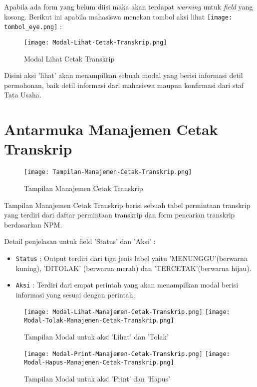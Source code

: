 \begin{enumerate}
\begin{itemize}
\end{itemize}
Apabila ada form yang belum diisi maka akan terdapat \textit{warning} untuk \textit{field} yang kosong.
Berikut ini apabila mahasiswa menekan tombol aksi lihat \texttt{[image: tombol\_eye.png]} :
\begin{figure} [H]
	\centering  
	\texttt{[image: Modal-Lihat-Cetak-Transkrip.png]}  
	\caption{Modal Lihat Cetak Transkrip} 
\end{figure}
\noindent Disini aksi 'lihat' akan menampilkan sebuah modal yang berisi informasi detil permohonan, baik detil informasi dari mahasiswa maupun konfirmasi dari staf Tata Usaha.


\section{Antarmuka Manajemen Cetak Transkrip}
\begin{figure} [H]
	\centering  
	\texttt{[image: Tampilan-Manajemen-Cetak-Transkrip.png]}  
	\caption{Tampilan Manajemen Cetak Transkrip} 	
\end{figure}

Tampilan Manajemen Cetak Transkrip berisi sebuah tabel permintaan transkrip yang terdiri dari daftar permintaan transkrip dan form pencarian transkrip berdasarkan NPM.

\noindent Detail penjelasan untuk field 'Status' dan 'Aksi' :
\begin{itemize}
	\item[ ] \texttt{Status} : Output terdiri dari tiga jenis label yaitu 'MENUNGGU'(berwarna kuning), 'DITOLAK' (berwarna merah) dan 'TERCETAK'(berwarna hijau). 
	\item[ ] \texttt{Aksi} : Terdiri dari empat perintah yang akan menampilkan modal berisi informasi yang sesuai dengan perintah.
\end{itemize}

\begin{figure} [H]
	\centering  
	\texttt{[image: Modal-Lihat-Manajemen-Cetak-Transkrip.png]}  
	\texttt{[image: Modal-Tolak-Manajemen-Cetak-Transkrip.png]} 
	\caption{Tampilan Modal untuk aksi 'Lihat' dan 'Tolak'} 	
\end{figure}
\begin{figure} [H]
	\centering  
	\texttt{[image: Modal-Print-Manajemen-Cetak-Transkrip.png]}  
	\texttt{[image: Modal-Hapus-Manajemen-Cetak-Transkrip.png]} 
	\caption{Tampilan Modal untuk aksi 'Print' dan 'Hapus'} 	
\end{figure}


\end{enumerate}
